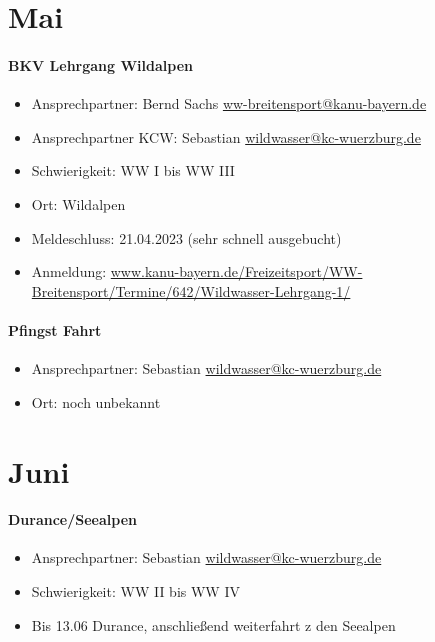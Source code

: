 \documentclass[12pt, a4paper]{report}
\begin{document}
\section*{Mai}\paragraph{BKV Lehrgang Wildalpen}
\begin{itemize}
    \item Ansprechpartner: Bernd Sachs \href{mailto:ww-breitensport@kanu-bayern.de}{ww-breitensport@kanu-bayern.de}
    \item Ansprechpartner KCW: Sebastian \href{mailto:wildwasser@kc-wuerzburg.de}{wildwasser@kc-wuerzburg.de}
    \item Schwierigkeit: WW I bis WW III
    \item Ort: Wildalpen
    \item Meldeschluss: 21.04.2023 (sehr schnell ausgebucht)
    \item Anmeldung: \url{www.kanu-bayern.de/Freizeitsport/WW-Breitensport/Termine/642/Wildwasser-Lehrgang-1/}
\end{itemize}

\paragraph{Pfingst Fahrt}
\begin{itemize}
    \item Ansprechpartner: Sebastian \href{mailto:wildwasser@kc-wuerzburg.de}{wildwasser@kc-wuerzburg.de}
    \item Ort: noch unbekannt
\end{itemize}

\section*{Juni}\paragraph{Durance/Seealpen}
\begin{itemize}
    \item Ansprechpartner: Sebastian \href{mailto:wildwasser@kc-wuerzburg.de}{wildwasser@kc-wuerzburg.de}
    \item Schwierigkeit: WW II bis WW IV
    \item Bis 13.06 Durance, anschließend weiterfahrt z den Seealpen
\end{itemize}
\end{document}
